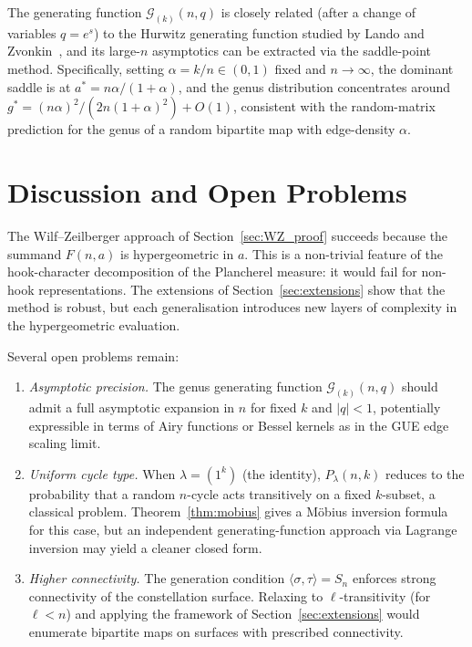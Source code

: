 \begin{remark}
The generating function $\mathcal{G}_{(k)}(n,q)$ is closely related (after a
change of variables $q=e^s$) to the Hurwitz generating function studied by
Lando and Zvonkin~\cite{LandoZvonkin}, and its large-$n$ asymptotics can be
extracted via the saddle-point method.  Specifically, setting
$\alpha=k/n\in(0,1)$ fixed and $n\to\infty$, the dominant saddle is at
$a^*=n\alpha/(1+\alpha)$, and the genus distribution concentrates around
$g^*=(n\alpha)^2/(2n(1+\alpha)^2)+O(1)$, consistent with the
random-matrix prediction for the genus of a random bipartite map with
edge-density $\alpha$.
\end{remark}

\section{Discussion and Open Problems}
\label{sec:discussion}

The Wilf–Zeilberger approach of Section~\ref{sec:WZ_proof} succeeds because
the summand $F(n,a)$ is hypergeometric in $a$.  This is a non-trivial feature
of the hook-character decomposition of the Plancherel measure: it would fail
for non-hook representations.  The extensions of
Section~\ref{sec:extensions} show that the method is robust, but each
generalisation introduces new layers of complexity in the hypergeometric
evaluation.

Several open problems remain:
\begin{enumerate}[(1)]
\item \emph{Asymptotic precision.}  The genus generating function
      $\mathcal{G}_{(k)}(n,q)$ should admit a full asymptotic expansion
      in $n$ for fixed $k$ and $|q|<1$, potentially expressible in terms of
      Airy functions or Bessel kernels as in the GUE edge scaling limit.
\item \emph{Uniform cycle type.}  When $\lambda=(1^k)$ (the identity),
      $P_\lambda(n,k)$ reduces to the probability that a random $n$-cycle
      acts transitively on a fixed $k$-subset, a classical problem.
      Theorem~\ref{thm:mobius} gives a Möbius inversion formula for this
      case, but an independent generating-function approach via Lagrange
      inversion may yield a cleaner closed form.
\item \emph{Higher connectivity.}  The generation condition
      $\langle\sigma,\tau\rangle=S_n$ enforces strong connectivity of the
      constellation surface.  Relaxing to $\ell$-transitivity (for $\ell<n$)
      and applying the framework of Section~\ref{sec:extensions} would
      enumerate bipartite maps on surfaces with prescribed connectivity.
\end{enumerate}

